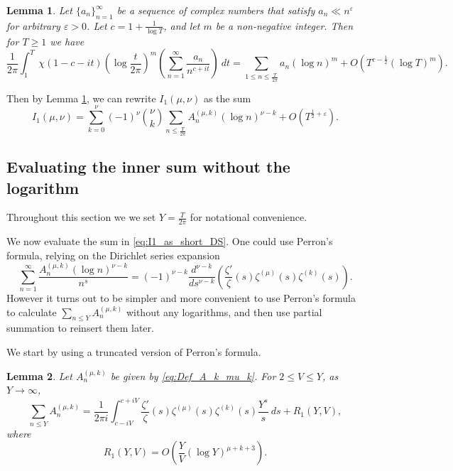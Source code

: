 \documentclass[12pt, a4paper,reqno]{amsart}
\newtheorem{lemma}{Lemma}
\theoremstyle{definition}
\numberwithin{equation}{section}
\begin{document}
\begin{lemma}\label{5.1.2}
    Let $\{a_n\}_{n=1}^{\infty}$ be a sequence of complex numbers that satisfy $a_n\ll n^{\varepsilon}$ for arbitrary $\varepsilon>0$. Let $c=1+\frac{1}{\log T}$, and let $m$ be a non-negative integer. Then for $T\ge 1$ we have 
    \begin{equation*}
        \frac{1}{2\pi}\int_1^T\ \chi(1-c-it) \left(\log\frac{t}{2\pi}\right)^m \left( \sum_{n=1}^{\infty} \frac{a_n}{n^{c+it}}\right) \ dt = \sum_{1\le n\le\frac{T}{2\pi}}a_n(\log n)^m+O\left(T^{c-\frac{1}{2}}(\log T)^m\right).
    \end{equation*}
\end{lemma}


Then by Lemma \ref{5.1.2}, we can rewrite $I_1(\mu,\nu)$ as the sum
\begin{equation} \label{eq:I1_as_short_DS}
    I_1(\mu,\nu)= \sum_{k=0}^{\nu} (-1)^{\nu} \binom{\nu}{k} 
\sum_{n\le\frac{T}{2\pi}}A_n^{(\mu,k)}(\log n)^{\nu-k}+O\left(T^{\frac{1}{2}+\varepsilon}\right).
\end{equation}

\subsection{Evaluating the inner sum without the logarithm}\label{subsection: sum=residue} \hfill

Throughout this section we  we set $Y = \frac{T}{2\pi}$ for notational convenience.

We now evaluate the sum in \eqref{eq:I1_as_short_DS}. One could use Perron's formula, relying on the Dirichlet series expansion
\[
\sum_{n=1}^\infty \frac{A_n^{(\mu,k)}(\log n)^{\nu-k}}{n^s} = (-1)^{\nu-k} \frac{d^{\nu-k}}{ds^{\nu-k}} \left(\frac{\zeta'}{\zeta}(s)\zeta^{(\mu)}(s)\zeta^{(k)}(s) \right).
\]
However it turns out to be simpler and more convenient to use Perron's formula to calculate $\sum_{n\le Y} A_n^{(\mu,k)}$ without any logarithms, and then use partial summation to reinsert them later. 

We start by using a truncated version of Perron's formula.

\begin{lemma}\label{lem11DMVT}
    Let $A_n^{(\mu,k)}$ be given by \eqref{eq:Def_A_k_mu_k}. For $2\le V\le Y$, as $Y\to\infty$, 
    \begin{equation*}
        \sum_{n\le Y}A_n^{(\mu,k)}=\frac{1}{2\pi i}\int_{c-iV}^{c+iV}\frac{\zeta'}{\zeta}(s)\zeta^{(\mu)}(s)\zeta^{(k)}(s)\frac{Y^s}{s} \ ds+R_1(Y,V),
    \end{equation*}
    where 
    \begin{equation*}
        R_1(Y,V)= O\left(\frac{Y}{V}(\log Y)^{\mu+k+3}\right).
    \end{equation*}
\end{lemma}
\end{document}
